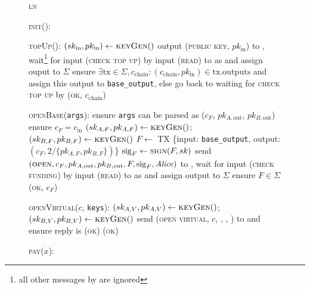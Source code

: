 \begin{figure}[H]
  \begin{systembox}{\textsc{ln}}
    \begin{algorithmic}[1]
      \State \textsc{init}():
      \Indent
        \State \TODO{}
      \EndIndent
      \Statex

      \State \textsc{topUp}(\alice):
      \Indent
        \State $(sk_{\mathrm{in}}, pk_{\mathrm{in}}) \gets \textsc{keyGen}()$
        \State output (\textsc{public key}, $pk_{\mathrm{in}}$) to \alice,
        wait\footnote{all other messages by \alice are ignored} for input
        (\textsc{check top up}) by \alice
        \State input (\textsc{read}) to \ledger as \alice and assign ouput to
        $\Sigma$
        \State ensure $\exists \mathrm{tx} \in \Sigma, c_{\mathrm{chain}}:
        (c_{\mathrm{chain}}, pk_{\mathrm{in}}) \in \mathrm{tx.outputs}$ and
        assign this output to \texttt{base\_output}, else go back to waiting for
        \textsc{check top up} by \alice
        \State \Return (\textsc{ok}, $c_{\mathrm{chain}}$)
      \EndIndent
      \Statex

      \State \textsc{openBase}(\texttt{args}):
      \Indent
        \State ensure \texttt{args} can be parsed as ($c_F$, $pk_{A,
        \mathrm{out}}$, $pk_{B, \mathrm{out}}$)
        \State ensure $c_F = c_{\mathrm{in}}$
        \State $(sk_{A, F}, pk_{A, F}) \gets \textsc{keyGen}()$; $(sk_{B, F},
        pk_{B, F}) \gets \textsc{keyGen}()$
        \State $F \gets$ TX \{input: \texttt{base\_output}, output: $(c_F,
        2/\{pk_{A, F}, pk_{B, F}\})$\}
        \State $\mathrm{sig}_F \gets \textsc{sign}(F, sk)$
        \State send $(\textsc{open}, c_F, pk_{A, \mathrm{out}}, pk_{B,
        \mathrm{out}}, F, \mathrm{sig}_F, \mathit{Alice})$ to \adversary, wait for
        input (\textsc{check funding}) by \alice
        \State input (\textsc{read}) to \ledger as \alice and assign output to
        $\Sigma$
        \State ensure $F \in \Sigma$
        \State \Return (\textsc{ok}, $c_F$)
      \EndIndent
      \Statex

      \State \textsc{openVirtual}($c$, \texttt{keys}):
      \Indent
        \State $(sk_{A, V}, pk_{A, V}) \gets \textsc{keyGen}()$; $(sk_{B, V},
        pk_{B, V}) \gets \textsc{keyGen}()$
        \State {}
        \State send (\textsc{open virtual}, $c$, \bob, \charlie, \alice) to
        \adversary and ensure reply is \textsc{(ok)}
        \State \Return (\textsc{ok})
      \EndIndent
      \Statex

      \State \textsc{pay}($x$):
      \Indent
        \State \TODO{}
      \EndIndent
      \Statex


\end{algorithmic}
\end{systembox}
\end{figure}
